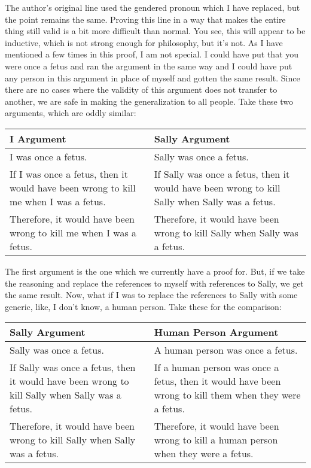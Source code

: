 The author's original line used the gendered pronoun which I have replaced, but the point remains the same. Proving this line in a way that makes the entire thing still valid is a bit more difficult than normal. You see, this will appear to be inductive, which is not strong enough for philosophy, but it's not. As I have mentioned a few times in this proof, I am not special. I could have put that you were once a fetus and ran the argument in the same way and I could have put any person in this argument in place of myself and gotten the same result. Since there are no cases where the validity of this argument does not transfer to another, we are safe in making the generalization to all people. Take these two arguments, which are oddly similar:
\noindent
\begin{tabular}{p{2.75in}|p{2.75in}}
    I Argument&Sally Argument\\\hline
    I was once a fetus.&Sally was once a fetus.\\\hline
    If I was once a fetus, then it would have been wrong to kill me when I was a fetus.&If Sally was once a fetus, then it would have been wrong to kill Sally when Sally was a fetus.\\\hline 
    Therefore, it would have been wrong to kill me when I was a fetus.&    Therefore, it would have been wrong to kill Sally when Sally was a fetus.
 \end{tabular}

The first argument is the one which we currently have a proof for. But, if we take the reasoning and replace the references to myself with references to Sally, we get the same result. Now, what if I was to replace the references to Sally with some generic, like, I don't know, a human person. Take these for the comparison:
\noindent
\begin{tabular}{p{2.75in}|p{2.75in}}
    Sally Argument&Human Person Argument\\\hline
    Sally was once a fetus.&A human person was once a fetus.\\\hline
    If Sally was once a fetus, then it would have been wrong to kill Sally when Sally was a fetus.& If a human person was once a fetus, then it would have been wrong to kill them when they were a fetus.\\\hline 
    Therefore, it would have been wrong to kill Sally when Sally was a fetus.& Therefore, it would have been wrong to kill a human person when they were a fetus. 
\end{tabular}

